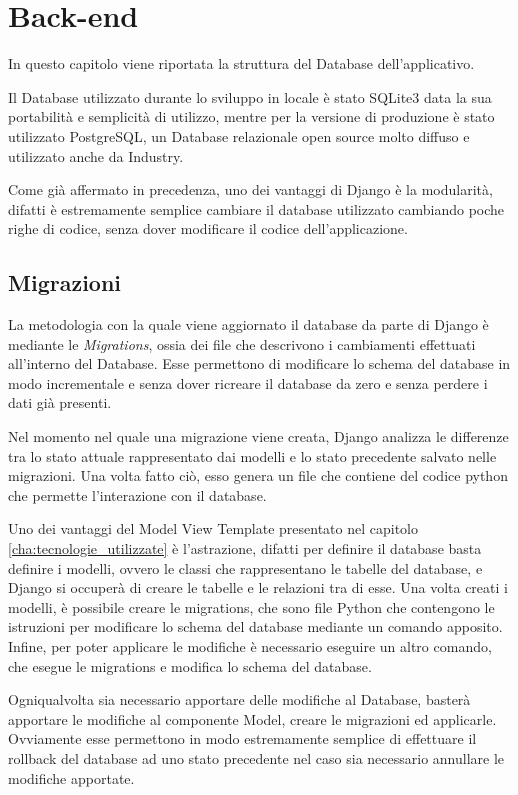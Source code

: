 \chapter{Back-end}

In questo capitolo viene riportata la struttura del Database dell'applicativo.

Il Database utilizzato durante lo sviluppo in locale è stato SQLite3 data la sua portabilità e semplicità di utilizzo, mentre per la versione di produzione è stato utilizzato PostgreSQL, un Database relazionale open source molto diffuso e utilizzato anche da Industry.

Come già affermato in precedenza, uno dei vantaggi di Django è la modularità, difatti è estremamente semplice cambiare il database utilizzato cambiando poche righe di codice, senza dover modificare il codice dell'applicazione.

\section{Migrazioni}
La metodologia con la quale viene aggiornato il database da parte di Django è mediante le \textit{Migrations}, ossia dei file che descrivono i cambiamenti effettuati all'interno del Database. Esse permettono di modificare lo schema del database in modo incrementale e senza dover ricreare il database da zero e senza perdere i dati già presenti.

Nel momento nel quale una migrazione viene creata, Django analizza le differenze tra lo stato attuale rappresentato dai modelli e lo stato precedente salvato nelle migrazioni. Una volta fatto ciò, esso genera un file che contiene del codice python che permette l'interazione con il database.


Uno dei vantaggi del Model View Template presentato nel capitolo \ref{cha:tecnologie_utilizzate} è l'astrazione, difatti per definire il database basta definire i modelli, ovvero le classi che rappresentano le tabelle del database, e Django si occuperà di creare le tabelle e le relazioni tra di esse. Una volta creati i modelli, è possibile creare le migrations, che sono file Python che contengono le istruzioni per modificare lo schema del database mediante un comando apposito. Infine, per poter applicare le modifiche è necessario eseguire un altro comando, che esegue le migrations e modifica lo schema del database.


Ogniqualvolta sia necessario apportare delle modifiche al Database, basterà apportare le modifiche al componente Model, creare le migrazioni ed applicarle. Ovviamente esse permettono in modo estremamente semplice di effettuare il rollback del database ad uno stato precedente nel caso sia necessario annullare le modifiche apportate.

